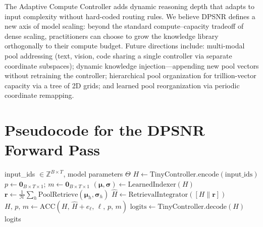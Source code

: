 \documentclass[11pt]{article}
\begin{document}
The Adaptive Compute Controller adds dynamic reasoning depth that adapts to
input complexity without hard-coded routing rules.
We believe DPSNR defines a new axis of model scaling: beyond the standard
compute--capacity tradeoff of dense scaling, practitioners can choose to grow
the knowledge library orthogonally to their compute budget.
Future directions include: multi-modal pool addressing (text, vision, code
sharing a single controller via separate coordinate subspaces); dynamic knowledge
injection---appending new pool vectors without retraining the controller;
hierarchical pool organization for trillion-vector capacity via a tree of 2D
grids; and learned pool reorganization via periodic coordinate remapping.




\appendix
\section{Pseudocode for the DPSNR Forward Pass}
\label{app:pseudocode}

\begin{algorithm}[ht]
\caption{DPSNR Forward Pass}
\label{alg:forward}
\begin{algorithmic}[1]
\Require input\_ids $\in \mathbb{Z}^{B \times T}$, model parameters $\Theta$
\State $H \leftarrow \mathrm{TinyController.encode(\text{input\_ids})}$
\State $p \leftarrow \mathbf{0}_{B \times T \times 1}$;\;
       $m \leftarrow \mathbf{0}_{B \times T \times 1}$
  \State $(\boldsymbol{\mu}, \boldsymbol{\sigma}) \leftarrow
    \mathrm{LearnedIndexer}(H)$
  \State $\mathbf{r} \leftarrow \frac{1}{\mathcal{H}}\sum_h
    \mathrm{PoolRetrieve}(\boldsymbol{\mu}_h, \boldsymbol{\sigma}_h)$
  \State $\hat{H} \leftarrow \mathrm{RetrievalIntegrator}([H \| \mathbf{r}])$
  \State $H,\, p,\, m \leftarrow \mathrm{ACC}(H,\, \hat{H} + e_\ell,\, \ell,\, p,\, m)$
\EndFor
\State $\mathrm{logits} \leftarrow \mathrm{TinyController.decode}(H)$
\State \Return logits
\end{algorithmic}
\end{algorithm}
\end{document}
